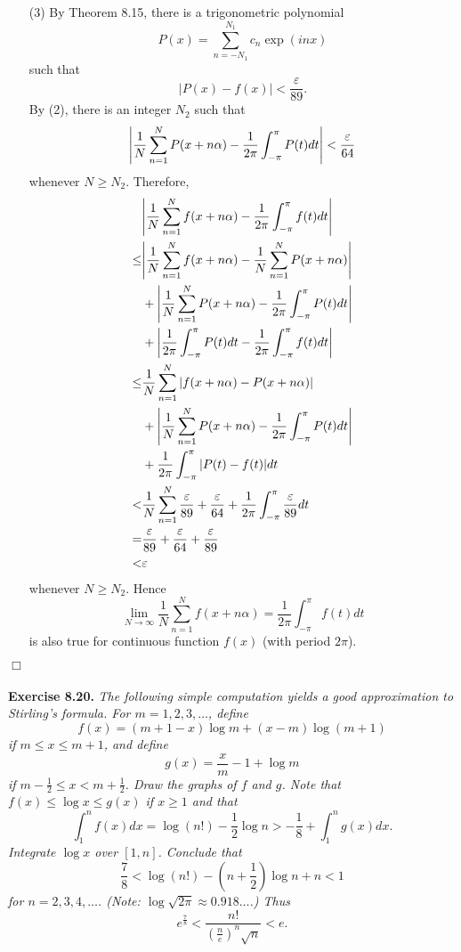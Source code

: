 \documentclass{article}
\begin{document}
\begin{enumerate}
\item[(3)]
By Theorem 8.15, there is a trigonometric polynomial
\[
  P(x) = \sum_{n=-N_1}^{N_1} c_n \exp(inx)
\]
such that
\[
  |P(x) - f(x)| < \frac{\varepsilon}{89}.
\]
By (2), there is an integer $N_2$ such that
\[
  \abs{\frac{1}{N} \sum_{n=1}^{N} P(x+n\alpha)
  - \frac{1}{2\pi} \int_{-\pi}^{\pi} P(t) dt} < \frac{\varepsilon}{64}
\]
whenever $N \geq N_2$.
Therefore,
  \begin{align*}
    &\abs{\frac{1}{N} \sum_{n=1}^{N} f(x+n\alpha)
      - \frac{1}{2\pi} \int_{-\pi}^{\pi} f(t) dt} \\
    \leq&
    \abs{\frac{1}{N} \sum_{n=1}^{N} f(x+n\alpha) - \frac{1}{N} \sum_{n=1}^{N} P(x+n\alpha)} \\
      &+ \abs{\frac{1}{N} \sum_{n=1}^{N} P(x+n\alpha) - \frac{1}{2\pi} \int_{-\pi}^{\pi} P(t) dt} \\
      &+ \abs{\frac{1}{2\pi} \int_{-\pi}^{\pi} P(t) dt - \frac{1}{2\pi} \int_{-\pi}^{\pi} f(t) dt} \\
    \leq&
    \frac{1}{N} \sum_{n=1}^{N} \abs{ f(x+n\alpha) - P(x+n\alpha) } \\
      &+ \abs{\frac{1}{N} \sum_{n=1}^{N} P(x+n\alpha) - \frac{1}{2\pi} \int_{-\pi}^{\pi} P(t) dt} \\
      &+ \frac{1}{2\pi} \int_{-\pi}^{\pi} \abs{P(t) - f(t)} dt \\
    <&
    \frac{1}{N} \sum_{n=1}^{N} \frac{\varepsilon}{89}
      + \frac{\varepsilon}{64}
      + \frac{1}{2\pi} \int_{-\pi}^{\pi} \frac{\varepsilon}{89} dt \\
    =&
    \frac{\varepsilon}{89} + \frac{\varepsilon}{64} + \frac{\varepsilon}{89} \\
    <& \varepsilon
  \end{align*}
whenever $N \geq N_2$.
Hence
\[
  \lim_{N \to \infty} \frac{1}{N} \sum_{n=1}^{N} f(x+n\alpha)
  = \frac{1}{2\pi} \int_{-\pi}^{\pi} f(t) dt
\]
is also true for continuous function $f(x)$ (with period $2\pi$).
\end{enumerate}
$\Box$ \\\\






\textbf{Exercise 8.20.}
\emph{The following simple computation yields a good approximation to
Stirling's formula.
For $m=1,2,3,\ldots$, define
\[
  f(x) = (m+1-x) \log m + (x-m) \log(m+1)
\]
if $m \leq x \leq m+1$, and define
\[
  g(x) = \frac{x}{m} - 1 + \log m
\]
if $m - \frac{1}{2} \leq x < m + \frac{1}{2}$.
Draw the graphs of $f$ and $g$.
Note that $f(x) \leq \log x \leq g(x)$ if $x \geq 1$ and that
\[
  \int_{1}^{n} f(x)dx = \log(n!) - \frac{1}{2} \log n > -\frac{1}{8} + \int_{1}^{n} g(x)dx.
\]
Integrate $\log x$ over $[1,n]$.
Conclude that
\[
  \frac{7}{8} < \log(n!) - \left(n+\frac{1}{2}\right) \log n + n < 1
\]
for $n=2,3,4,\ldots$.
(Note: $\log \sqrt{2\pi} \approx 0.918\ldots$.)
Thus
\[
  e^{\frac{7}{8}} < \frac{n!}{(\frac{n}{e})^n \sqrt{n}} < e.
\]} \\
\end{document}
